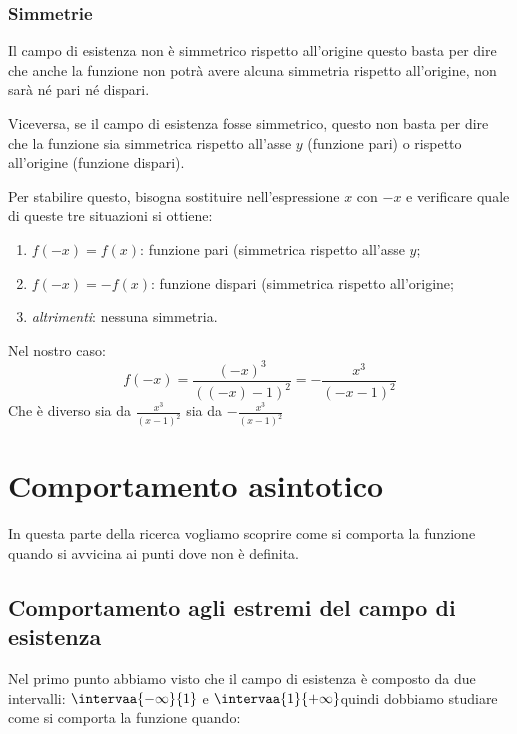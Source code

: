 \subsubsection{Simmetrie}

Il campo di esistenza non è simmetrico rispetto all'origine questo basta per
dire che anche la funzione non potrà avere alcuna simmetria rispetto 
all'origine, non sarà né pari né dispari.

Viceversa, se il campo di esistenza fosse simmetrico, questo non basta per 
dire che la funzione sia simmetrica rispetto all'asse \(y\) 
(funzione pari) o rispetto all'origine (funzione dispari).

Per stabilire questo, bisogna sostituire nell'espressione \(x\) con \(-x\) e 
verificare quale di queste tre situazioni si ottiene:

\begin{enumerate} [nosep]
 \item \(f(-x)=f(x)\): funzione pari (simmetrica rispetto all'asse \(y\);
 \item \(f(-x)=-f(x)\): funzione dispari (simmetrica rispetto all'origine;
 \item \emph{altrimenti}: nessuna simmetria.
\end{enumerate}

Nel nostro caso: 
\[f(-x)=\frac{(-x)^3}{((-x)-1)^2} = -\frac{x^3}{(-x-1)^2}\]
Che è diverso sia da 
\(\frac{x^3}{(x-1)^2}\)
sia da
\(-\frac{x^3}{(x-1)^2}\)


\section{Comportamento asintotico}
\label{sec:comportamentoasintotico}

In questa parte della ricerca vogliamo scoprire come si comporta la funzione 
quando si avvicina ai punti dove non è definita.

\subsection{Comportamento agli estremi del campo di esistenza}

Nel primo punto abbiamo visto che il campo di esistenza è composto da due 
intervalli: \(\intervaa{-\infty}{1}\) e \(\intervaa{1}{+\infty}\)quindi 
dobbiamo studiare come si comporta la funzione quando:

